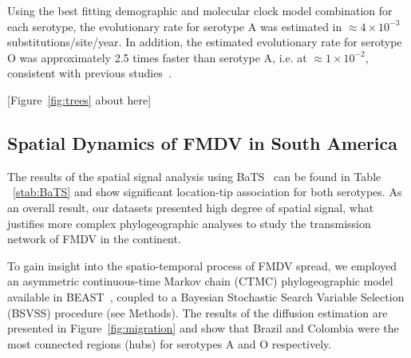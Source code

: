 \documentclass[10pt]{article}
\begin{document}
Using the best fitting demographic and molecular clock model combination for each serotype, the evolutionary rate for serotype A was estimated in  $\approx 4 \times 10^{-3}$ substitutions/site/year.
In addition, the estimated evolutionary rate for serotype O was approximately 2.5 times faster than serotype A, i.e. at $\approx 1 \times 10^{-2}$, consistent with previous studies~\cite{tully,Carvalho2013,Muellner2011}. 
\begin{center}
 [Figure~\ref{fig:trees} about here]
\end{center}

\subsection*{Spatial Dynamics of FMDV in South America}

The results of the spatial signal analysis using BaTS~\cite{bats} can be found in Table ~\ref{stab:BaTS} and show significant location-tip association for both serotypes.
As an overall result, our datasets presented high degree of spatial signal, what justifies more complex phylogeographic analyses to study the transmission network of FMDV in the continent.

To gain insight into the spatio-temporal process of FMDV spread, we employed an asymmetric continuous-time Markov chain (CTMC) phylogeographic model~\cite{roots} available in BEAST~\cite{beast2012}, coupled to a Bayesian Stochastic Search Variable Selection (BSVSS) procedure (see Methods).
The results of the diffusion estimation are presented in Figure~\ref{fig:migration} and show that Brazil and Colombia were the most connected regions (hubs) for serotypes A and O respectively.
\end{document}
